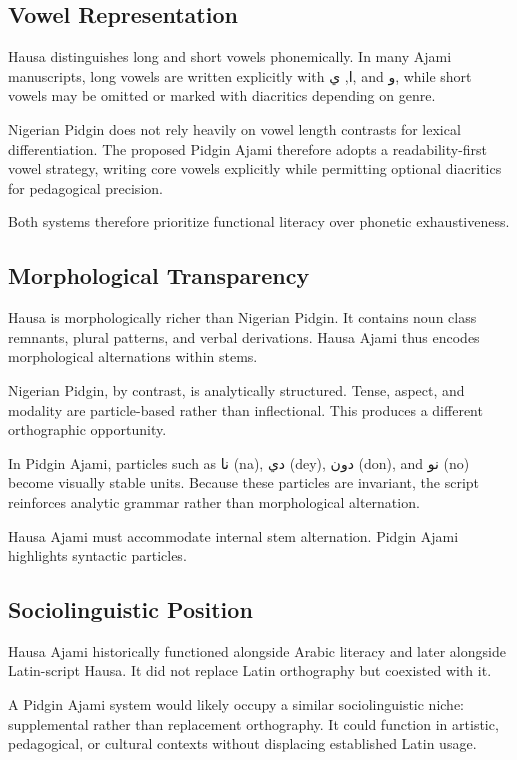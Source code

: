 \documentclass[12pt]{article}
\newcommand{\AR}[1]{\foreignlanguage{arabic}{#1}}
\begin{document}
\subsection{Vowel Representation}

Hausa distinguishes long and short vowels phonemically. In many Ajami manuscripts, long vowels are written explicitly with \AR{ا}, \AR{ي}, and \AR{و}, while short vowels may be omitted or marked with diacritics depending on genre.

Nigerian Pidgin does not rely heavily on vowel length contrasts for lexical differentiation. The proposed Pidgin Ajami therefore adopts a readability-first vowel strategy, writing core vowels explicitly while permitting optional diacritics for pedagogical precision.

Both systems therefore prioritize functional literacy over phonetic exhaustiveness.

\subsection{Morphological Transparency}

Hausa is morphologically richer than Nigerian Pidgin. It contains noun class remnants, plural patterns, and verbal derivations. Hausa Ajami thus encodes morphological alternations within stems.

Nigerian Pidgin, by contrast, is analytically structured. Tense, aspect, and modality are particle-based rather than inflectional. This produces a different orthographic opportunity.

In Pidgin Ajami, particles such as \AR{نا} (na), \AR{دي} (dey), \AR{دون} (don), and \AR{نو} (no) become visually stable units. Because these particles are invariant, the script reinforces analytic grammar rather than morphological alternation.

Hausa Ajami must accommodate internal stem alternation. Pidgin Ajami highlights syntactic particles.

\subsection{Sociolinguistic Position}

Hausa Ajami historically functioned alongside Arabic literacy and later alongside Latin-script Hausa. It did not replace Latin orthography but coexisted with it.

A Pidgin Ajami system would likely occupy a similar sociolinguistic niche: supplemental rather than replacement orthography. It could function in artistic, pedagogical, or cultural contexts without displacing established Latin usage.
\end{document}
